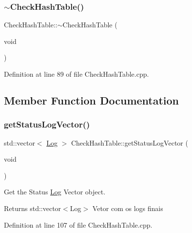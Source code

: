 \subsubsection{\texorpdfstring{$\sim$\+Check\+Hash\+Table()}{~CheckHashTable()}}
{\footnotesize\ttfamily Check\+Hash\+Table\+::$\sim$\+Check\+Hash\+Table (\begin{DoxyParamCaption}\item[{void}]{ }\end{DoxyParamCaption})}



Definition at line 89 of file Check\+Hash\+Table.\+cpp.



\subsection{Member Function Documentation}
\mbox{\label{class_check_hash_table_ac57b97e1bf321ea232370d1ae0da3a55}} 
\subsubsection{\texorpdfstring{get\+Status\+Log\+Vector()}{getStatusLogVector()}}
{\footnotesize\ttfamily std\+::vector$<$ \hyperlink{class_log}{Log} $>$ Check\+Hash\+Table\+::get\+Status\+Log\+Vector (\begin{DoxyParamCaption}\item[{void}]{ }\end{DoxyParamCaption})}



Get the Status \hyperlink{class_log}{Log} Vector object. 

\begin{DoxyReturn}{Returns}
std\+::vector$<$\+Log$>$ Vetor com os logs finais 
\end{DoxyReturn}


Definition at line 107 of file Check\+Hash\+Table.\+cpp.

\mbox{\label{class_check_hash_table_a976b114162765decaa1c7fe0b8e16cf8}} 

